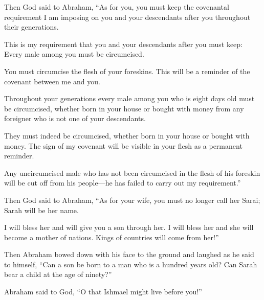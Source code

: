 \begin{scripture}
 Then God said to Abraham, ``As for you, you must keep the covenantal requirement I am imposing on you and your descendants after you throughout their generations.
 This is my requirement that you and your descendants after you must keep: Every male among you must be circumcised.
 You must circumcise the flesh of your foreskins. This will be a reminder of the covenant between me and you.
 Throughout your generations every male among you who is eight days old must be circumcised, whether born in your house or bought with money from any foreigner who is not one of your descendants.
 They must indeed be circumcised, whether born in your house or bought with money. The sign of my covenant will be visible in your flesh as a permanent reminder.
 Any uncircumcised male who has not been circumcised in the flesh of his foreskin will be cut off from his people---he has failed to carry out my requirement.''
\everypar{}

 Then God said to Abraham, ``As for your wife, you must no longer call her Sarai; Sarah will be her name.
 I will bless her and will give you a son through her. I will bless her and she will become a mother of nations. Kings of countries will come from her!''
\everypar{}

 Then Abraham bowed down with his face to the ground and laughed as he said to himself, ``Can a son be born to a man who is a hundred years old? Can Sarah bear a child at the age of ninety?''
 Abraham said to God, ``O that Ishmael might live before you!''
\everypar{}


\end{scripture}
